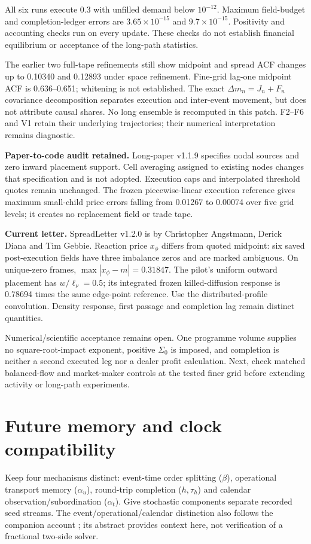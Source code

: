 \documentclass[11pt,a4paper]{article}
\begin{document}
All six runs execute 0.3 with unfilled demand below $10^{-12}$. Maximum field-budget
and completion-ledger errors are $3.65\times10^{-15}$ and $9.7\times10^{-15}$.
Positivity and accounting checks run on every update. These checks do not
establish financial equilibrium or acceptance of the long-path statistics.

The earlier two full-tape refinements still show midpoint and spread ACF
changes up to 0.10340 and 0.12893 under space refinement. Fine-grid
lag-one midpoint ACF is 0.636--0.651; whitening is not established.
The exact $\Delta m_n=J_n+F_n$ covariance decomposition separates execution
and inter-event movement, but does not attribute causal shares.
No long ensemble is recomputed in this patch. F2--F6 and V1 retain their
underlying trajectories; their numerical interpretation remains diagnostic.

\textbf{Paper-to-code audit retained.} Long-paper v1.1.9 specifies nodal
sources and zero inward placement support. Cell averaging assigned to
existing nodes changes that specification and is not adopted. Execution caps
and interpolated threshold quotes remain unchanged. The frozen
piecewise-linear execution reference gives maximum small-child price errors
falling from 0.01267 to 0.00074 over five grid levels; it creates no
replacement field or trade tape.

\textbf{Current letter.} SpreadLetter v1.2.0 is by Christopher Angstmann,
Derick Diana and Tim Gebbie. Reaction price $x_\phi$ differs from quoted
midpoint: six saved post-execution fields have three imbalance zeros and
are marked ambiguous. On unique-zero frames, $\max|x_\phi-m|=0.31847$.
The pilot's uniform outward placement has $w/\ell_\nu=0.5$; its integrated
frozen killed-diffusion response is 0.78694 times the same edge-point
reference. Use the distributed-profile convolution. Density response,
first passage and completion lag remain distinct quantities.

Numerical/scientific acceptance remains open. One programme volume supplies
no square-root-impact exponent, positive $\Sigma_0$ is imposed, and
completion is neither a second executed leg nor a dealer profit calculation.
Next, check matched balanced-flow and market-maker controls at the tested finer grid before extending activity or long-path experiments.

\newpage
\section{Future memory and clock compatibility}
Keep four mechanisms distinct: event-time order splitting ($\beta$),
operational transport memory ($\alpha_u$), round-trip completion ($h,\tau_h$)
and calendar observation/subordination ($\alpha_t$). Give stochastic
components separate recorded seed streams. The event/operational/calendar
distinction also follows the companion account \cite{clocks}; its abstract
provides context here, not verification of a fractional two-side solver.
\end{document}
